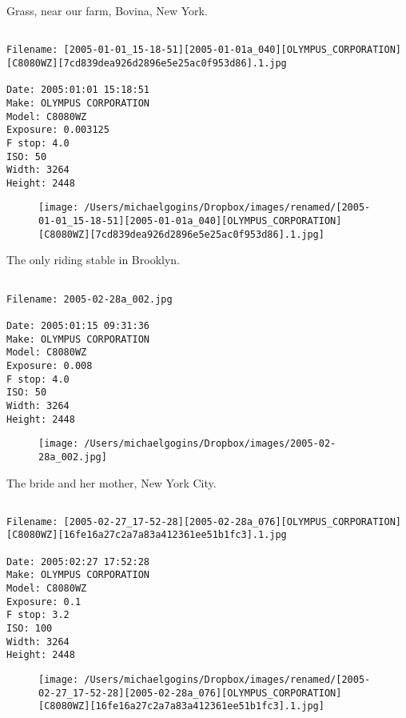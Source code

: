 \clearpage
\onecolumn
\noindent Grass, near our farm, Bovina, New York.
\noindent
\begin{lstlisting}

Filename: [2005-01-01_15-18-51][2005-01-01a_040][OLYMPUS_CORPORATION][C8080WZ][7cd839dea926d2896e5e25ac0f953d86].1.jpg

Date: 2005:01:01 15:18:51
Make: OLYMPUS CORPORATION
Model: C8080WZ
Exposure: 0.003125
F stop: 4.0
ISO: 50
Width: 3264
Height: 2448
\end{lstlisting}
\clearpage

\begin{figure}
\texttt{[image: /Users/michaelgogins/Dropbox/images/renamed/[2005-01-01\_15-18-51][2005-01-01a\_040][OLYMPUS\_CORPORATION][C8080WZ][7cd839dea926d2896e5e25ac0f953d86].1.jpg]}
\end{figure}
    
\clearpage
\onecolumn
\noindent The only riding stable in Brooklyn.
\noindent
\begin{lstlisting}

Filename: 2005-02-28a_002.jpg

Date: 2005:01:15 09:31:36
Make: OLYMPUS CORPORATION
Model: C8080WZ
Exposure: 0.008
F stop: 4.0
ISO: 50
Width: 3264
Height: 2448
\end{lstlisting}
\clearpage

\begin{figure}
\texttt{[image: /Users/michaelgogins/Dropbox/images/2005-02-28a\_002.jpg]}
\end{figure}
    
\clearpage
\onecolumn
\noindent The bride and her mother, New York City.
\noindent
\begin{lstlisting}

Filename: [2005-02-27_17-52-28][2005-02-28a_076][OLYMPUS_CORPORATION][C8080WZ][16fe16a27c2a7a83a412361ee51b1fc3].1.jpg

Date: 2005:02:27 17:52:28
Make: OLYMPUS CORPORATION
Model: C8080WZ
Exposure: 0.1
F stop: 3.2
ISO: 100
Width: 3264
Height: 2448
\end{lstlisting}
\clearpage

\begin{figure}
\texttt{[image: /Users/michaelgogins/Dropbox/images/renamed/[2005-02-27\_17-52-28][2005-02-28a\_076][OLYMPUS\_CORPORATION][C8080WZ][16fe16a27c2a7a83a412361ee51b1fc3].1.jpg]}
\end{figure}
    
